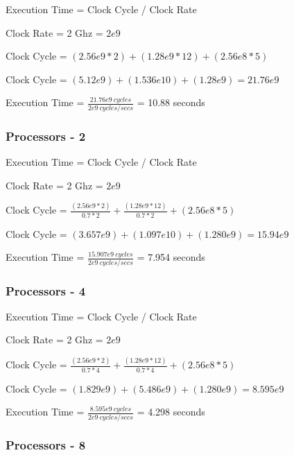 \documentclass{article}
\begin{document}
    Execution Time = Clock Cycle / Clock Rate

    Clock Rate = 2 Ghz = $2e9$

    Clock Cycle = $(2.56e9 * 2) + (1.28e9 * 12) + (2.56e8 * 5)$

    Clock Cycle = $(5.12e9) + (1.536e10) + (1.28e9) = 21.76e9$
    \vspace*{6pt}

    Execution Time = $\frac{21.76e9\ cycles}{2e9\ cycles/secs}$ = 10.88 seconds

    \subsubsection*{Processors - 2}

    Execution Time = Clock Cycle / Clock Rate

    Clock Rate = 2 Ghz = $2e9$
    \vspace*{6pt}

    Clock Cycle = $\frac{(2.56e9 * 2)}{0.7 * 2} + \frac{(1.28e9 * 12)}{0.7 * 2} + (2.56e8 * 5)$
    \vspace*{6pt}

    Clock Cycle = $(3.657e9) + (1.097e10) + (1.280e9) = 15.94e9$
    \vspace*{6pt}

    Execution Time = $\frac{15.907e9\ cycles}{2e9\ cycles/secs}$ = 7.954 seconds

    \subsubsection*{Processors - 4}

    Execution Time = Clock Cycle / Clock Rate

    Clock Rate = 2 Ghz = $2e9$
    \vspace*{6pt}

    Clock Cycle = $\frac{(2.56e9 * 2)}{0.7 * 4} + \frac{(1.28e9 * 12)}{0.7 * 4} + (2.56e8 * 5)$
    \vspace*{6pt}

    Clock Cycle = $(1.829e9) + (5.486e9) + (1.280e9) = 8.595e9$
    \vspace*{6pt}

    Execution Time = $\frac{8.595e9\ cycles}{2e9\ cycles/secs}$ = 4.298 seconds

    \subsubsection*{Processors - 8}
\end{document}
